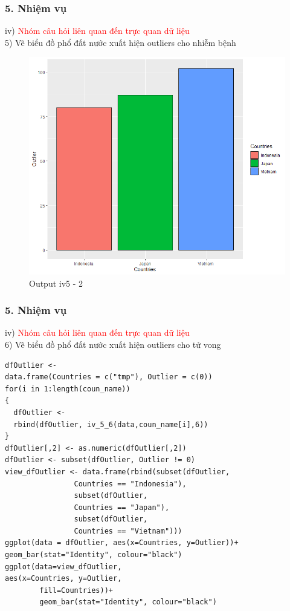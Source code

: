 \documentclass[english,10pt,table]{beamer}
\begin{document}
\begin{frame}[fragile]
\frametitle{5.  Nhiệm vụ}
	iv) \textcolor{red}{Nhóm câu hỏi liên quan đến trực quan dữ liệu}\\%
    5) Vẽ biểu đồ phổ đất nước xuất hiện outliers cho nhiễm bệnh
	\begin{figure}[h!]
	\begin{center}
		    \includegraphics[scale = 0.4]{Images/IV/iv (5) - 2.png}
		     \caption{Output iv5 - 2}
		\end{center}
		\end{figure}
\end{frame}

\begin{frame}[fragile]
\frametitle{5.  Nhiệm vụ}
iv) \textcolor{red}{Nhóm câu hỏi liên quan đến trực quan dữ liệu}\\
    6) Vẽ biểu đồ phổ đất nước xuất hiện outliers cho tử vong
\begin{lstlisting}[frame=single]  
dfOutlier <- 
data.frame(Countries = c("tmp"), Outlier = c(0))
for(i in 1:length(coun_name))
{
  dfOutlier <- 
  rbind(dfOutlier, iv_5_6(data,coun_name[i],6))
}
dfOutlier[,2] <- as.numeric(dfOutlier[,2])
dfOutlier <- subset(dfOutlier, Outlier != 0)
view_dfOutlier <- data.frame(rbind(subset(dfOutlier, 
                Countries == "Indonesia"),
                subset(dfOutlier, 
                Countries == "Japan"),
                subset(dfOutlier, 
                Countries == "Vietnam")))
ggplot(data = dfOutlier, aes(x=Countries, y=Outlier))+
geom_bar(stat="Identity", colour="black")
ggplot(data=view_dfOutlier, 
aes(x=Countries, y=Outlier, 
        fill=Countries))+ 
        geom_bar(stat="Identity", colour="black")
\end{lstlisting}
\end{frame}
\end{document}
